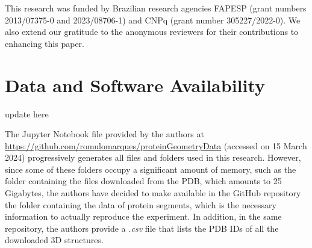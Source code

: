 \documentclass[journal=jacsat,manuscript=article]{achemso}
\begin{document}
\begin{acknowledgement}

{\color{red}This research was funded by Brazilian research agencies FAPESP (grant numbers 2013/07375-0 and 2023/08706-1) and
CNPq (grant number 305227/2022-0). We also extend our gratitude to the anonymous reviewers for their contributions to enhancing this paper.}

\end{acknowledgement}




\section{Data and Software Availability}

{\color{red} update here}

The Jupyter Notebook file provided by the authors at \url{https://github.com/romulomarques/proteinGeometryData} (accessed on 15 March 2024) progressively generates all files and folders used in this research. However, since some of these folders occupy a significant amount of memory, such as the folder containing the files downloaded from the PDB, which amounts to 25 Gigabytes, the authors have decided to make available in the GitHub repository the folder containing the data of protein segments, which is the necessary information to actually reproduce the experiment. In addition, in the same repository, the authors provide a \emph{.csv} file that lists the PDB IDs of all the downloaded 3D structures.
\end{document}
